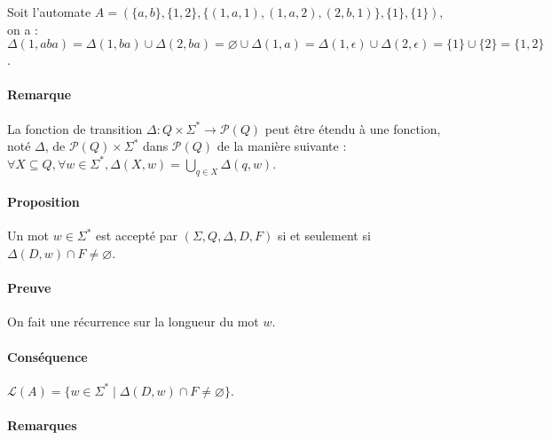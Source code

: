 Soit l'automate $A = (\{a,b\} , \{1,2\} , \{(1,a,1) , (1,a,2) , (2,b,1)\} , \{1\} , \{1\})$, on a :\\

$\Delta(1,aba)=\Delta(1,ba) \cup \Delta(2,ba) =\varnothing \cup \Delta(1,a)=\Delta(1,\epsilon) \cup \Delta(2,\epsilon) = \{1\} \cup \{2\} = \{1,2\}$.\\



\paragraph{Remarque} %
\label{par:remarque}

La fonction de transition $\Delta : Q \times \Sigma^* \rightarrow \mathcal{P}(Q)$ peut être étendu à une fonction, noté $\Delta$, de $\mathcal{P}(Q) \times \Sigma^*$ dans $\mathcal{P}(Q)$ de la manière suivante :\\

$\forall X \subseteq Q, \forall w \in \Sigma^*, \Delta(X,w) = \bigcup\limits_{q \in X}\Delta(q,w)$.



\paragraph{Proposition} %
\label{par:proposition}

Un mot $w \in \Sigma^*$ est accepté par $(\Sigma,Q,\Delta,D,F)$ si et seulement si $\Delta(D,w) \cap F \not = \varnothing$.



\paragraph{Preuve} %
\label{par:preuve}

On fait une récurrence sur la longueur du mot $w$. 



\paragraph{Conséquence} %
\label{par:cons_quence}

$\mathcal{L}(A) = \{ w \in \Sigma^* \mid \Delta(D,w) \cap F \not = \varnothing\}$.



\paragraph{Remarques} %
\label{par:remarques}

